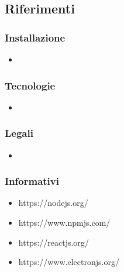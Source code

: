 \subsection{Riferimenti}
\subsubsection{Installazione}
\begin{itemize}
	\item 
\end{itemize}
\subsubsection{Tecnologie}
\begin{itemize}
	\item 
\end{itemize}
\subsubsection{Legali}
\begin{itemize}
	\item 
\end{itemize}
\subsubsection{Informativi}
\begin{itemize}
	\item https://nodejs.org/
	\item https://www.npmjs.com/
	\item https://reactjs.org/
	\item https://www.electronjs.org/
\end{itemize}
